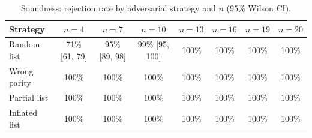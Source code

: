 \begin{table}[htbp]
\centering
\caption{Soundness: rejection rate by adversarial strategy and $n$ (95\% Wilson CI).}
\label{tab:soundness}
\begin{tabular}{lccccccc}
\toprule
Strategy & $n=4$ & $n=7$ & $n=10$ & $n=13$ & $n=16$ & $n=19$ & $n=20$ \\
\midrule
Random list & 71\% [61, 79] & 95\% [89, 98] & 99\% [95, 100] & 100\% & 100\% & 100\% & 100\% \\
Wrong parity & 100\% & 100\% & 100\% & 100\% & 100\% & 100\% & 100\% \\
Partial list & 100\% & 100\% & 100\% & 100\% & 100\% & 100\% & 100\% \\
Inflated list & 100\% & 100\% & 100\% & 100\% & 100\% & 100\% & 100\% \\
\bottomrule
\end{tabular}
\end{table}
